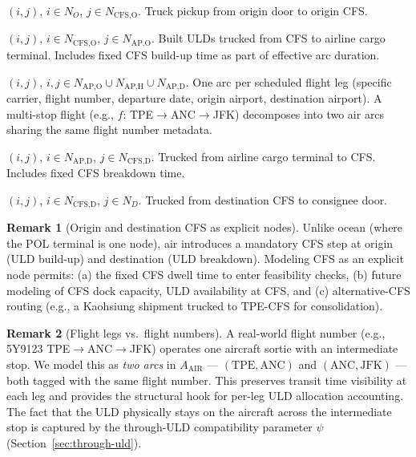 \documentclass[11pt,a4paper]{article}
\theoremstyle{definition}
\newtheorem{remark}{Remark}
\begin{document}
\begin{description}[leftmargin=3.4cm, labelwidth=3.2cm, style=nextline]
  \item[$A_{\text{PU}}$ — Pickup] $(i,j)$, $i \in N_O$, $j \in N_{\text{CFS,O}}$.
        Truck pickup from origin door to origin CFS.
  \item[$A_{\text{OC}}$ — Origin CFS to origin airport] $(i,j)$, $i \in N_{\text{CFS,O}}$,
        $j \in N_{\text{AP,O}}$. Built ULDs trucked from CFS to airline cargo terminal.
        Includes fixed CFS build-up time as part of effective arc duration.
  \item[$A_{\text{AIR}}$ — Flight legs] $(i,j)$, $i, j \in N_{\text{AP,O}} \cup N_{\text{AP,H}}
        \cup N_{\text{AP,D}}$. One arc per scheduled flight leg (specific carrier, flight
        number, departure date, origin airport, destination airport).
        A multi-stop flight (e.g., $f$: TPE$\to$ANC$\to$JFK) decomposes into two air arcs
        sharing the same flight number metadata.
  \item[$A_{\text{DC}}$ — Destination airport to destination CFS] $(i,j)$, $i \in N_{\text{AP,D}}$,
        $j \in N_{\text{CFS,D}}$. Trucked from airline cargo terminal to CFS.
        Includes fixed CFS breakdown time.
  \item[$A_{\text{FD}}$ — Final delivery] $(i,j)$, $i \in N_{\text{CFS,D}}$, $j \in N_D$.
        Trucked from destination CFS to consignee door.
\end{description}

\begin{remark}[Origin and destination CFS as explicit nodes]
Unlike ocean (where the POL terminal is one node), air introduces a mandatory CFS step at
origin (ULD build-up) and destination (ULD breakdown). Modeling CFS as an explicit node
permits: (a) the fixed CFS dwell time to enter feasibility checks, (b) future modeling of
CFS dock capacity, ULD availability at CFS, and (c) alternative-CFS routing (e.g., a
Kaohsiung shipment trucked to TPE-CFS for consolidation).
\end{remark}

\begin{remark}[Flight legs vs.\ flight numbers]
A real-world flight number (e.g., 5Y9123 TPE$\to$ANC$\to$JFK) operates one aircraft sortie
with an intermediate stop. We model this as \emph{two arcs} in $A_{\text{AIR}}$ — $(\text{TPE},
\text{ANC})$ and $(\text{ANC}, \text{JFK})$ — both tagged with the same flight number. This
preserves transit time visibility at each leg and provides the structural hook for per-leg
ULD allocation accounting. The fact that the ULD physically stays on the aircraft across the
intermediate stop is captured by the through-ULD compatibility parameter $\psi$
(Section~\ref{sec:through-uld}).
\end{remark}
\end{document}
